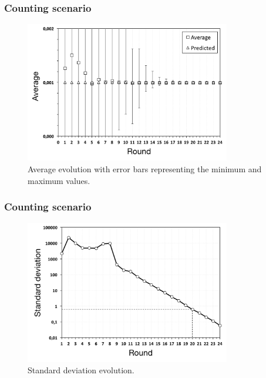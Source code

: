 \documentclass{beamer}
\begin{document}
\begin{frame}
\frametitle{Counting scenario}

\begin{figure}[p]
\centering
\includegraphics[keepaspectratio=true, width=0.8\textwidth]{images/counting_average}
\caption{Average evolution with error bars representing the minimum and maximum values.}
\label{fig:counting_average}
\end{figure}

\end{frame}


\begin{frame}
\frametitle{Counting scenario}
    
\begin{figure}[p]
\centering
\includegraphics[keepaspectratio=true, width=0.8\textwidth]{images/counting_standard_deviation}
\caption{Standard deviation evolution.}
\label{fig:counting_standard_deviation}
\end{figure}

\end{frame}
\end{document}
